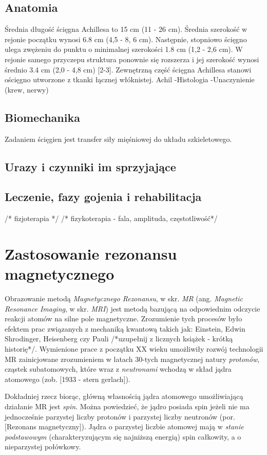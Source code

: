 \subsection{Anatomia}
Średnia długość ścięgna Achillesa to 15 cm (11 - 26 cm). Średnia szerokość w rejonie początku wynosi 6.8 cm (4,5 - 8, 6 cm). Następnie, stopniowo ścięgno ulega zwężeniu do punktu o minimalnej szerokości 1.8 cm (1,2 - 2,6 cm). W rejonie samego przyczepu struktura ponownie się rozszerza i jej szerokość wynosi średnio 3.4 cm (2,0 - 4,8 cm) [2-3].
Zewnętrzną część ścięgna Achillesa stanowi ościęgno utworzone z tkanki łącznej włóknistej.
Achil
-Histologia
-Unaczynienie (krew, nerwy)

\subsection{Biomechanika}
Zadaniem ścięgien jest transfer siły mięśniowej do układu szkieletowego.
\subsection{Urazy i czynniki im sprzyjające}
\subsection{Leczenie, fazy gojenia i rehabilitacja}
\label{gojenie}
/* fizjoterapia */
/* fizykoterapia - fala, amplituda, częstotliwość*/ 

\section{Zastosowanie rezonansu magnetycznego}
Obrazowanie metodą \textit{Magnetycznego Rezonansu}, w skr. \textit{MR} (ang. \textit{Magnetic Resonance Imaging}, w skr. \textit{MRI}) jest metodą bazującą na odpowiednim odczycie reakcji atomów na silne pole magnetyczne. Zrozumienie tych procesów było efektem prac związanych z mechaniką kwantową takich jak: Einstein, Edwin Shrodinger, Heisenberg czy Pauli /*uzupełnij z licznych książek - krótką historię*/. Wymienione prace z początku XX wieku umożliwiły rozwój technologii MR zainicjowane zrozumieniem w latach 30-tych magnetycznej natury \textit{protonów}, cząstek subatomowych, które wraz z \textit{neutronami} wchodzą w skład jądra atomowego (zob. [1933 - stern gerlach]).

Dokładniej rzecz biorąc, główną własnością jądra atomowego umożliwiającą działanie MR jest \textit{spin}. Można powiedzieć, że jądro posiada spin jeżeli nie ma jednocześnie parzystej liczby protonów i parzystej liczby neutronów (por. [Rezonans magnetyczny]). Jądra o parzystej liczbie atomowej mają w \textit{stanie podstawowym} (charakteryzującym się najniższą energią) spin całkowity, a o nieparzystej połówkowy.

